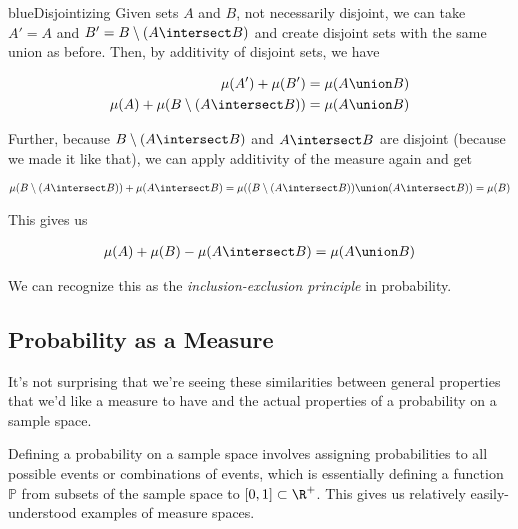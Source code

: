 \documentclass[../analysis.tex]{subfiles}
\begin{document}
    \begin{mycolorbox}{blue}{Disjointizing}
        Given sets $A$ and $B$, not necessarily disjoint, we can take $A' = A$ and $B' = B \setminus (A \intersect B)$ and create disjoint sets with the same union as before. Then, by additivity of disjoint sets, we have

        \begin{align*}
            \mu(A') + \mu(B') = \mu(A \union B)\\
            \mu(A) + \mu(B \setminus (A \intersect B)) = \mu(A \union B)
        \end{align*}

        Further, because $B \setminus (A \intersect B)$ and $A \intersect B$ are disjoint (because we made it like that), we can apply additivity of the measure again and get

        \begin{align*}
            \mu(B \setminus (A \intersect B)) + \mu(A \intersect B) = \mu((B \setminus (A \intersect B)) \union (A \intersect B)) = \mu(B) 
        \end{align*}

        This gives us 

        \begin{align*}
            \mu(A) + \mu(B) - \mu(A \intersect B) = \mu(A \union B)
        \end{align*}
    \end{mycolorbox}

    We can recognize this as the \emph{inclusion-exclusion principle} in probability.
    
    \subsection{Probability as a Measure}
    It's not surprising that we're seeing these similarities between general properties that we'd like a measure to have and the actual properties of a probability on a sample space. 
    
    Defining a probability on a sample space involves assigning probabilities to all possible events or combinations of events, which is essentially defining a function $\mathbb{P}$ from subsets of the sample space to $[0, 1] \subset \R^+$. This gives us relatively easily-understood examples of measure spaces.
    
\end{document}
